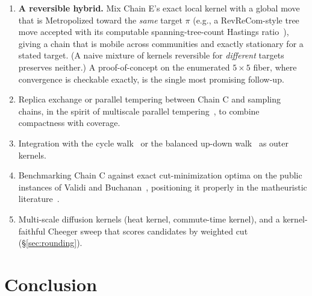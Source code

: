 \documentclass[11pt]{article}
\begin{document}
\begin{enumerate}
  \item \textbf{A reversible hybrid.} Mix Chain E's exact local
    kernel with a global move that is Metropolized toward the
    \emph{same} target $\pi$ (e.g., a RevReCom-style tree move
    accepted with its computable spanning-tree-count Hastings
    ratio~\cite{cannon2022spanning,autry2023metropolized}), giving a
    chain that is mobile across communities and exactly stationary for a
    stated target. (A naive mixture of kernels reversible for
    \emph{different} targets preserves neither.) A proof-of-concept on
    the enumerated $5 \times 5$ fiber, where convergence is checkable
    exactly, is the single most promising follow-up.
  \item Replica exchange or parallel tempering between Chain C and
    sampling chains, in the spirit of multiscale parallel
    tempering~\cite{chuang2025multiscale}, to combine compactness with
    coverage.
  \item Integration with the cycle walk~\cite{deford2025cycle} or the
    balanced up-down walk~\cite{akitaya2026bud} as outer kernels.
  \item Benchmarking Chain C against exact cut-minimization optima on
    the public instances of Validi and
    Buchanan~\cite{validi2022political}, positioning it properly in
    the matheuristic literature~\cite{brous2025recom}.
  \item Multi-scale diffusion kernels (heat kernel, commute-time
    kernel), and a kernel-faithful Cheeger sweep that scores
    candidates by weighted cut (\S\ref{sec:rounding}).
\end{enumerate}

\section{Conclusion}\label{sec:conclusion}
\end{document}
